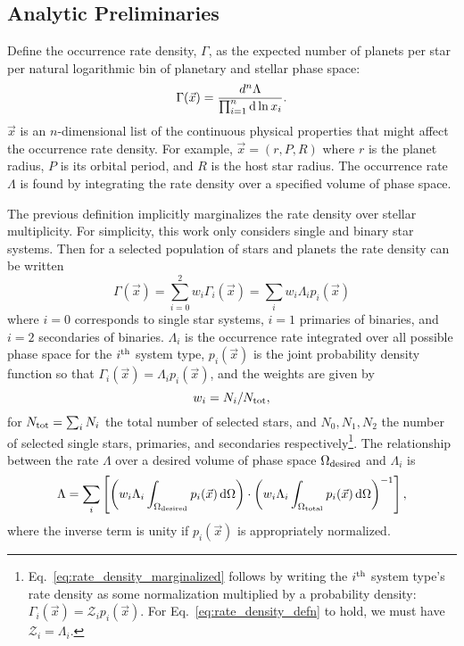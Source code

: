 \subsection{Analytic Preliminaries}

Define the occurrence rate density, $\Gamma$,
as the expected number of planets per star per natural logarithmic bin 
of planetary and stellar phase space:
\begin{equation}
\Gamma(\vec{x}) = \frac{d^n\Lambda}{\prod_{i=1}^{n} {\rm d} \ln x_i  }.
\label{eq:rate_density_defn}
\end{equation}
$\vec{x}$ is an $n$-dimensional list of the continuous physical properties 
that might affect the occurrence rate density. 
For example,
$\vec{x}=(r,P,R)$ where $r$ is the planet radius, $P$ is its orbital period, 
and $R$ is the host star radius.
The occurrence rate $\Lambda$ is found by integrating the rate density over a 
specified volume of phase space.


The previous definition implicitly marginalizes the rate density over stellar 
multiplicity.
For simplicity, this work only considers single and binary star systems.
Then for a selected population of stars and planets the rate density can be 
written
\begin{equation}
\Gamma(\vec{x})
= \sum_{i=0}^{2} w_i \Gamma_i(\vec{x})
= \sum_i w_i \Lambda_i p_i(\vec{x})
\label{eq:rate_density_marginalized}
\end{equation}
where $i=0$ corresponds to single star systems, $i=1$ primaries of binaries, 
and $i=2$ secondaries of binaries.
$\Lambda_i$ is the occurrence rate integrated over all possible phase space  
for the $i^{\rm th}$ system type, $p_i(\vec{x})$ is the joint 
probability density function so that $\Gamma_i(\vec{x}) = \Lambda_i 
p_i(\vec{x})$, 
and the weights are given by 
\begin{equation}
w_i = N_i/N_{\rm tot},
\end{equation}
for $N_{\rm tot} = \sum_i N_i$ the total number of selected stars, and 
$N_0,N_1,N_2$ the number of selected single stars, primaries, and 
secondaries respectively\footnote{
Eq.~\ref{eq:rate_density_marginalized} follows by writing the $i^{\rm 
th}$ system type's rate density as some normalization multiplied by a 
probability density:
$\Gamma_i(\vec{x}) = \mathcal{Z}_i p_i(\vec{x})$.
For Eq.~\ref{eq:rate_density_defn} to hold, we must have $\mathcal{Z}_i = 
\Lambda_i$.
}.
The relationship between the rate $\Lambda$ over a desired volume of 
phase space $\Omega_{\rm desired}$ and $\Lambda_i$ is
\begin{equation}
\Lambda = \sum_i
\left[
\left(
w_i \Lambda_i \int_{\Omega_{\rm desired}} p_i(\vec{x}) \,{\rm d}\Omega
\right)
\cdot
\left(
w_i \Lambda_i \int_{\Omega_{\rm total}} p_i(\vec{x}) \,{\rm d}\Omega
\right)^{-1}
\right],
\label{eq:occ_rate}
\end{equation}
where the inverse term is unity if $p_i(\vec{x})$ is appropriately normalized.

